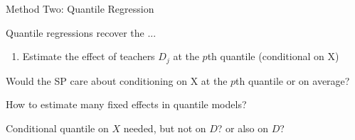 \documentclass[t,aspectratio=169,11pt]{beamer}
\newenvironment{wideitemize}{\itemize\addtolength{\itemsep}{14pt}}{\enditemize}
\begin{document}
\begin{frame}{Method Two: Quantile Regression}

\begin{wideitemize}

    \item Quantile regressions recover the ... \citep{}
    \begin{enumerate}
        \item Estimate the effect of teachers $D_j$ at the $p$th quantile (conditional on X)
        
    \end{enumerate}
    \item {\color{gray}{Is it really that simple?}}
    \item Would the SP care about conditioning on X at the $p$th quantile or on average?
    \item How to estimate many fixed effects in quantile models? 
    \item Conditional quantile on $X$ needed, but not on $D$? or also on $D$?

\end{wideitemize}
\end{frame}

\end{document}
